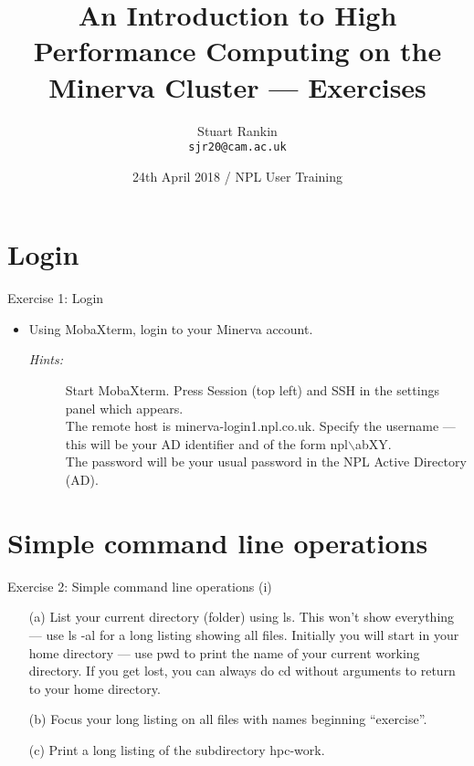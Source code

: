 \documentclass{beamer}
\title[An introduction to HPC on Minerva --- Exercises] %
{An Introduction to High Performance Computing on the Minerva Cluster --- Exercises}
\author[SJ Rankin] %
{Stuart Rankin\\ \texttt{sjr20@cam.ac.uk}}
\institute[UIS, University of Cambridge] %
{Research Computing Services (http://www.hpc.cam.ac.uk/)\\
University Information Services (http://www.uis.cam.ac.uk/)}
\date[24/04/2018] %
{24th April 2018 / NPL User Training}
\begin{document}
\begin{frame}
  \titlepage
\end{frame}

\section{Login}
\begin{frame}{Exercise 1: Login}
\begin{itemize}
\item{Using MobaXterm, login to your Minerva account.}
\begin{description}
\item[\emph{Hints:}]{\small Start MobaXterm. Press \alert{Session} (top left) and \alert{SSH} in the settings panel which appears.\\\smallskip
The remote host is \alert{minerva-login1.npl.co.uk}. Specify the username --- this will be your AD identifier and of the form \alert{npl$\backslash$abXY}.\hfill\\\smallskip
\smallskip
The password will be your usual password in the NPL Active Directory (AD).}
\end{description}
\end{itemize}
\end{frame}


\section{Simple command line operations}
\begin{frame}{Exercise 2: Simple command line operations (i)}
\begin{itemize}

\item[(a)]{List your current directory (folder) using \alert{ls}. This won't show everything --- use \alert{ls -al} for a long listing showing all files. Initially you will start in your home directory --- use \alert{pwd} to print the name of your current working directory. If you get lost, you can always do \alert{cd} without arguments to return to your home directory.}

\item[(b)]{Focus your long listing on \alert{all files with names beginning ``exercise''}.}

\item[(c)]{Print a long listing of the subdirectory \alert{hpc-work}.}

\end{itemize}
\end{frame}
\end{document}
